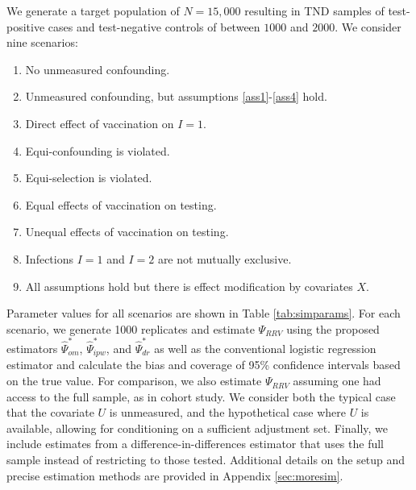 \documentclass[11pt]{article}
\begin{document}
 We generate a target population of $N = 15,000$ resulting in TND samples of test-positive cases and test-negative controls of between $1000$ and $2000$. We consider nine scenarios: 
 \begin{enumerate}
    \item No unmeasured confounding.
    \item Unmeasured confounding, but assumptions \ref{ass1}-\ref{ass4} hold.
    \item Direct effect of vaccination on $I=1$.
    \item Equi-confounding is violated.
    \item Equi-selection is violated.
    \item Equal effects of vaccination on testing.
    \item Unequal effects of vaccination on testing.
    \item Infections $I=1$ and $I=2$ are not mutually exclusive.
    \item All assumptions hold but there is effect modification by covariates $X$.
 \end{enumerate}
 Parameter values for all scenarios are shown in Table \ref{tab:simparams}. For each scenario, we generate 1000 replicates and estimate $\Psi_{RRV}$ using the proposed estimators $\widehat{\Psi}_{om}^*$, $\widehat{\Psi}_{ipw}^*$, and $\widehat{\Psi}_{dr}^*$ as well as the conventional logistic regression estimator and calculate the bias and coverage of 95\% confidence intervals based on the true value. For comparison, we also estimate $\Psi_{RRV}$  assuming one had access to the full sample, as in cohort study. We consider both the typical case that the covariate $U$ is unmeasured, and the hypothetical case where $U$ is available, allowing for conditioning on a sufficient adjustment set. Finally, we include estimates from a difference-in-differences estimator that uses the full sample instead of restricting to those tested. Additional details on the setup and precise estimation methods are provided in Appendix \ref{sec:moresim}.
\end{document}
